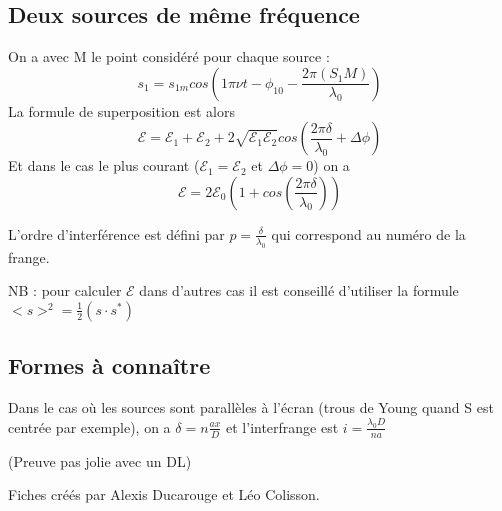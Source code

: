 \documentclass[9pt]{article}
\begin{document}
\begin{multicols*}{2}
\section{Deux sources de même fréquence}
On a avec M le point considéré pour chaque source :
$$s_1 = s_{1m}cos(1\pi \nu t - \phi_{10} - \frac{2\pi (S_1M)}{\lambda_0})$$
La formule de superposition est alors
$$\mathcal{E} = \mathcal{E}_1 + \mathcal{E}_2 + 2 \sqrt{\mathcal{E}_1\mathcal{E}_2}cos(\frac{2 \pi \delta}{\lambda_0} + \Delta\phi)$$
Et dans le cas le plus courant ($\mathcal{E}_1 = \mathcal{E}_2$ et $\Delta\phi = 0$) on a
$$\boxed{\mathcal{E} = 2\mathcal{E}_0 \left(1 + cos(\frac{2 \pi \delta}{\lambda_0})\right)}$$

L'ordre d'interférence est défini par $p = \frac{\delta}{\lambda_0} $ qui correspond au numéro de la frange.

NB : pour calculer $\mathcal{E}$ dans d'autres cas il est conseillé d'utiliser la formule $<s>^2 = \frac{1}{2} (s\cdot s^*)$

\subsection{Formes à connaître}
Dans le cas où les sources sont parallèles à l'écran (trous de Young quand S est centrée par exemple), on a
$\boxed{\delta = n \frac{ax}{D}}$ et l'interfrange est $\boxed{i = \frac{\lambda_0D}{na}}$

(Preuve pas jolie avec un DL)

\footnotesize{Fiches créés par Alexis Ducarouge et Léo Colisson.}

\end{multicols*}
\end{document}
